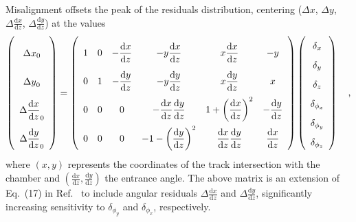 Misalignment offsets the peak of the residuals distribution, centering
($\Delta x$, $\Delta y$, $\Delta \frac{\textrm{d}x}{\textrm{d}z}$,
$\Delta \frac{\textrm{d}y}{\textrm{d}z}$) at the values
\begin{equation}
\renewcommand{\arraystretch}{2.5}
\left(\begin{array}{c}
{\Delta x}_0 \\
{\Delta y}_0 \\
{\Delta \dfrac{\textrm{d}x}{\textrm{d}z}}_0 \\
{\Delta \dfrac{\textrm{d}y}{\textrm{d}z}}_0 \\
\end{array}\right)
=
{\renewcommand{\arraystretch}{2.5}
\left(\begin{array}{c c c c c c}
1 & 0 & -\dfrac{\textrm{d}x}{\textrm{d}z} & -y \dfrac{\textrm{d}x}{\textrm{d}z} & x \dfrac{\textrm{d}x}{\textrm{d}z} & -y \\
0 & 1 & -\dfrac{\textrm{d}y}{\textrm{d}z} & -y \dfrac{\textrm{d}y}{\textrm{d}z} & x \dfrac{\textrm{d}y}{\textrm{d}z} & x \\
0 & 0 & 0 & -\dfrac{\textrm{d}x}{\textrm{d}z} \dfrac{\textrm{d}y}{\textrm{d}z} & 1 + \left(\dfrac{\textrm{d}x}{\textrm{d}z}\right)^2 & -\dfrac{\textrm{d}y}{\textrm{d}z} \\
0 & 0 & 0 & -1 - \left(\dfrac{\textrm{d}y}{\textrm{d}z}\right)^2 & \dfrac{\textrm{d}x}{\textrm{d}z}\dfrac{\textrm{d}y}{\textrm{d}z} & \dfrac{\textrm{d}x}{\textrm{d}z}
\end{array}\right)}
\renewcommand{\arraystretch}{1.7}
\left(\begin{array}{c}
\delta_x \\
\delta_y \\
\delta_z \\
\delta_{\phi_x} \\
\delta_{\phi_y} \\
\delta_{\phi_z}
\end{array}\right) \quad\mbox{,}
\label{eqn:dtmatrix}
\end{equation}
where $(x,y)$ represents the coordinates of the track intersection
with the chamber and $(\frac{\textrm{d}x}{\textrm{d}z},\frac{\textrm{d}y}{\textrm{d}z})$ the entrance
angle.  The above matrix is an extension of Eq.~(17) in
Ref.~\cite{Karimaki:2003bd} to include angular residuals
$\Delta \frac{\textrm{d}x}{\textrm{d}z}$ and $\Delta \frac{\textrm{d}y}{\textrm{d}z}$, significantly
increasing sensitivity to $\delta_{\phi_y}$ and $\delta_{\phi_x}$,
respectively.


